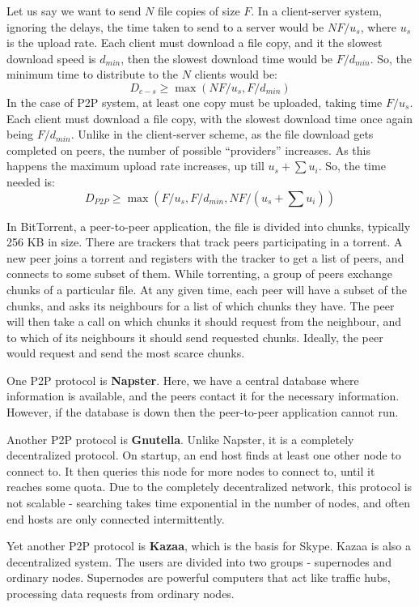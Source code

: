 \documentclass[12pt,letterpaper]{book}
\theoremstyle{definition}
\begin{document}
Let us say we want to send $N$ file copies of size $F$. In a client-server system, ignoring the delays, the time taken to send to a server would be $NF/u_s$, where $u_s$ is the upload rate. Each client must download a file copy, and it the slowest download speed is $d_{min}$, then the slowest download time would be $F/d_{min}$. So, the minimum time to distribute to the $N$ clients would be:
\[D_{c-s} \geq \max(NF/u_s,F/d_{min})\]
In the case of P2P system, at least one copy must be uploaded, taking time $F/u_s$. Each client must download a file copy, with the slowest download time once again being $F/d_{min}$. Unlike in the client-server scheme, as the file download gets completed on peers, the number of possible ``providers'' increases. As this happens the maximum upload rate increases, up till $u_s +\sum u_i$. So, the time needed is:
\[D_{P2P} \geq \max(F/u_s,F/d_{min},NF/(u_s+ \sum u_i))\]

In BitTorrent, a peer-to-peer application, the file is divided into chunks, typically 256 KB in size. There are trackers that track peers participating in a torrent. A new peer joins a torrent and registers with the tracker to get a list of peers, and connects to some subset of them. While torrenting, a group of peers exchange chunks of a particular file. At any given time, each peer will have a subset of the chunks, and asks its neighbours for a list of which chunks they have. The peer will then take a call on which chunks it should request from the neighbour, and to which of its neighbours it should send requested chunks. Ideally, the peer would request and send the most scarce chunks.

One P2P protocol is \textbf{Napster}. Here, we have a central database where information is available, and the peers contact it for the necessary information. However, if the database is down then the peer-to-peer application cannot run.

Another P2P protocol is \textbf{Gnutella}. Unlike Napster, it is a completely decentralized protocol. On startup, an end host finds at least one other node to connect to. It then queries this node for more nodes to connect to, until it reaches some quota. Due to the completely decentralized network, this protocol is not scalable - searching takes time exponential in the number of nodes, and often end hosts are only connected intermittently.

Yet another P2P protocol is \textbf{Kazaa}, which is the basis for Skype. Kazaa is also a decentralized system. The users are divided into two groups - supernodes and ordinary nodes. Supernodes are powerful computers that act like traffic hubs, processing data requests from ordinary nodes.
\end{document}

